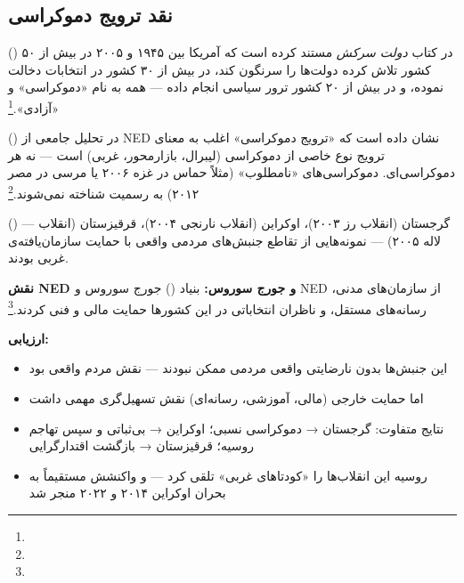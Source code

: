 \subsection{نقد ترویج دموکراسی}
\label{subsec:ch13-democracy-critique}

 () در کتاب \textit{دولت سرکش} مستند کرده است که آمریکا بین ۱۹۴۵ و ۲۰۰۵ در بیش از ۵۰ کشور تلاش کرده دولت‌ها را سرنگون کند، در بیش از ۳۰ کشور در انتخابات دخالت نموده، و در بیش از ۲۰ کشور ترور سیاسی انجام داده — همه به نام «دموکراسی» و «آزادی».\footnote{}

 () در تحلیل جامعی از NED نشان داده است که «ترویج دموکراسی» اغلب به معنای ترویج نوع خاصی از دموکراسی (لیبرال، بازارمحور، غربی) است — نه هر دموکراسی‌ای. دموکراسی‌های «نامطلوب» (مثلاً حماس در غزه ۲۰۰۶ یا مرسی در مصر ۲۰۱۲) به رسمیت شناخته نمی‌شوند.\footnote{}

\begin{tcolorbox}[casebox, title={مطالعه‌ی موردی: «انقلاب‌های رنگی»}]
 () — گرجستان (انقلاب رز ۲۰۰۳)، اوکراین (انقلاب نارنجی ۲۰۰۴)، قرقیزستان (انقلاب لاله ۲۰۰۵) — نمونه‌هایی از تقاطع جنبش‌های مردمی واقعی با حمایت سازمان‌یافته‌ی غربی بودند.

\textbf{نقش NED و جورج سوروس:} بنیاد  () جورج سوروس و NED از سازمان‌های مدنی، رسانه‌های مستقل، و ناظران انتخاباتی در این کشورها حمایت مالی و فنی کردند.\footnote{}

\textbf{ارزیابی:}
\begin{itemize}
\item این جنبش‌ها بدون نارضایتی واقعی مردمی ممکن نبودند — نقش مردم واقعی بود
\item اما حمایت خارجی (مالی، آموزشی، رسانه‌ای) نقش تسهیل‌گری مهمی داشت
\item نتایج متفاوت: گرجستان → دموکراسی نسبی؛ اوکراین → بی‌ثباتی و سپس تهاجم روسیه؛ قرقیزستان → بازگشت اقتدارگرایی
\item روسیه این انقلاب‌ها را «کودتاهای غربی» تلقی کرد — و واکنشش مستقیماً به بحران اوکراین ۲۰۱۴ و ۲۰۲۲ منجر شد
\end{itemize}
\end{tcolorbox}


